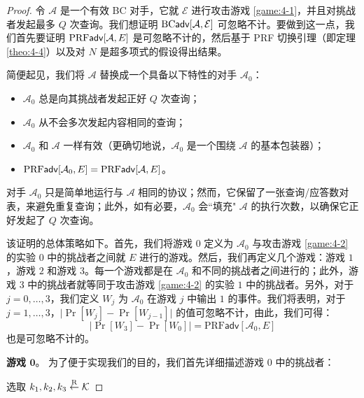 \begin{proof}
令 $\mathcal{A}$ 是一个有效 BC 对手，它就 $\mathcal{E}$ 进行攻击游戏 \ref{game:4-1}，并且对挑战者发起最多 $Q$ 次查询。我们想证明 ${\rm BC\mathsf{adv}}[\mathcal{A},\mathcal{E}]$ 可忽略不计。要做到这一点，我们首先要证明 ${\rm PRF\mathsf{adv}}[\mathcal{A}, E]$ 是可忽略不计的，然后基于 PRF 切换引理（即定理 \ref{theo:4-4}）以及对 $N$ 是超多项式的假设得出结果。

简便起见，我们将 $\mathcal{A}$ 替换成一个具备以下特性的对手 $\mathcal{A}_0$：
\begin{itemize}
	\item $\mathcal{A}_0$ 总是向其挑战者发起正好 $Q$ 次查询；
	\item $\mathcal{A}_0$ 从不会多次发起内容相同的查询；
	\item $\mathcal{A}_0$ 和 $\mathcal{A}$ 一样有效（更确切地说，$\mathcal{A}_0$ 是一个围绕 $\mathcal{A}$ 的基本包装器）；
	\item ${\rm PRF\mathsf{adv}}[\mathcal{A}_0, E]={\rm PRF\mathsf{adv}}[\mathcal{A}, E]$。
\end{itemize}
对手 $\mathcal{A}_0$ 只是简单地运行与 $\mathcal{A}$ 相同的协议；然而，它保留了一张查询/应答数对表，来避免重复查询；此外，如有必要，$\mathcal{A}_0$ 会``填充" $\mathcal{A}$ 的执行次数，以确保它正好发起了 $Q$ 次查询。

该证明的总体策略如下。首先，我们将游戏 $0$ 定义为 $\mathcal{A}_0$ 与攻击游戏 \ref{game:4-2} 的实验 $0$ 中的挑战者之间就 $E$ 进行的游戏。然后，我们再定义几个游戏：游戏 $1$，游戏 $2$ 和游戏 $3$。每一个游戏都是在 $\mathcal{A}_0$ 和不同的挑战者之间进行的；此外，游戏 $3$ 中的挑战者就等同于攻击游戏 \ref{game:4-2} 的实验 $1$ 中的挑战者。另外，对于 $j=0,\dots,3$，我们定义 $W_j$ 为 $\mathcal{A}_0$ 在游戏 $j$ 中输出 $1$ 的事件。我们将表明，对于 $j=1,\dots,3$，$\big\lvert\Pr[W_j]-\Pr[W_{j-1}]\big\rvert$ 的值可忽略不计，由此，我们可得：
\[
\big\lvert
\Pr[W_3]-\Pr[W_0]
\big\rvert
=\mathrm{PRF}\mathsf{adv}[\mathcal{A}_0,E]
\]
也是可忽略不计的。

\vspace{5pt}

\noindent
\textbf{游戏 $\mathbf{0}$}。
为了便于实现我们的目的，我们首先详细描述游戏 $0$ 中的挑战者：

\vspace{10pt}

\hspace*{5pt} 选取 $k_1,k_2,k_3\overset{\rm R}\leftarrow\mathcal{K}$

\vspace{5pt}


\end{proof}
